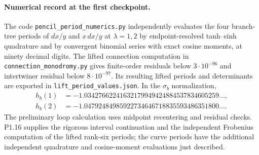 \paragraph{Numerical record at the first checkpoint.}
The code \texttt{pencil\_period\_numerics.py} independently evaluates
the four branch-tree periods of $dx/y$ and $x\,dx/y$ at $\lambda=1,2$
by endpoint-resolved tanh--sinh quadrature and by convergent binomial
series with exact cosine moments, at ninety decimal digits.
The lifted connection computation in
\texttt{connection\_monodromy.py} gives finite-order residuals below
$3\cdot10^{-96}$ and intertwiner residual below $8\cdot10^{-97}$.
Its resulting lifted periods and determinants are exported in
\texttt{lift\_period\_values.json}.  In the $\sigma_b$ normalization,
\[
\begin{split}
h_b(1)&=-1.03427662241632179949424884537834605259\ldots,\\
h_b(2)&=-1.04792484985922734646718835593486351800\ldots.
\end{split}
\]
The preliminary loop calculation uses midpoint recentering and residual
checks.  P1.16 supplies the rigorous interval continuation and the
independent Frobenius computation of the lifted rank-six periods;
the curve periods have the additional independent quadrature and
cosine-moment evaluations just described.


